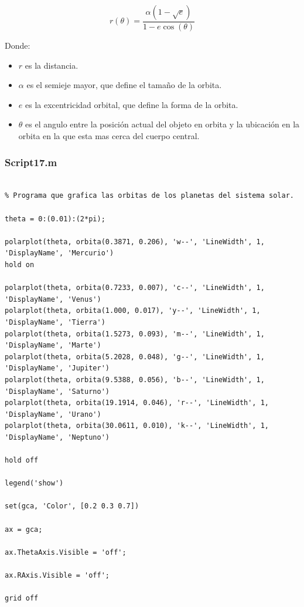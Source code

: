 \documentclass{article}
\begin{document}
	\begin{equation*}
		r(\theta) = \frac{\alpha(1-\sqrt{e})}{1-e\cos(\theta)}
	\end{equation*}
	
	Donde:
	
	\begin{itemize}
		\item $r$ es la distancia.
		\item $\alpha$ es el semieje mayor, que define el tamaño de la orbita.
		\item $e$ es la excentricidad orbital, que define la forma de la orbita.
		\item $\theta$ es el angulo entre la posición actual del objeto en orbita y la ubicación en la orbita en la que esta mas cerca del cuerpo central.
	\end{itemize}
	
	\subsubsection{Script17.m}
	
	\begin{lstlisting}

% Programa que grafica las orbitas de los planetas del sistema solar.

theta = 0:(0.01):(2*pi);

polarplot(theta, orbita(0.3871, 0.206), 'w--', 'LineWidth', 1, 'DisplayName', 'Mercurio')
hold on

polarplot(theta, orbita(0.7233, 0.007), 'c--', 'LineWidth', 1, 'DisplayName', 'Venus')
polarplot(theta, orbita(1.000, 0.017), 'y--', 'LineWidth', 1, 'DisplayName', 'Tierra')
polarplot(theta, orbita(1.5273, 0.093), 'm--', 'LineWidth', 1, 'DisplayName', 'Marte')
polarplot(theta, orbita(5.2028, 0.048), 'g--', 'LineWidth', 1, 'DisplayName', 'Jupiter')
polarplot(theta, orbita(9.5388, 0.056), 'b--', 'LineWidth', 1, 'DisplayName', 'Saturno')
polarplot(theta, orbita(19.1914, 0.046), 'r--', 'LineWidth', 1, 'DisplayName', 'Urano')
polarplot(theta, orbita(30.0611, 0.010), 'k--', 'LineWidth', 1, 'DisplayName', 'Neptuno')

hold off

legend('show')

set(gca, 'Color', [0.2 0.3 0.7])

ax = gca;

ax.ThetaAxis.Visible = 'off';

ax.RAxis.Visible = 'off';

grid off

	\end{lstlisting}
	
\end{document}
